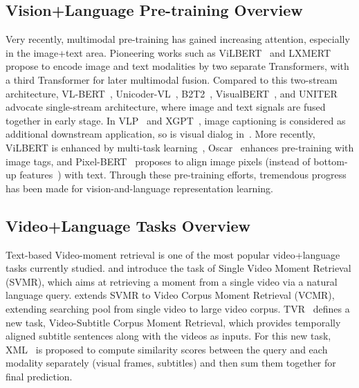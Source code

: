 \documentclass[11pt,a4paper]{article}
\begin{document}
\subsection{Vision+Language Pre-training Overview}\label{app:vl_overview}
Very recently, multimodal pre-training has gained increasing attention, especially in the image+text area.
Pioneering works such as ViLBERT~\cite{lu2019vilbert} and LXMERT~\cite{tan2019lxmert} propose to encode image and text modalities by two separate Transformers, with a third Transformer for later multimodal fusion. Compared to this two-stream architecture, 
VL-BERT~\cite{su2019vl}, Unicoder-VL~\cite{li2019unicoder}, B2T2~\cite{alberti2019fusion}, VisualBERT~\cite{li2019visualbert}, 
and UNITER~\cite{chen2019uniter} advocate single-stream architecture, where image and text signals are fused together in early stage. 
In VLP~\cite{zhou2019unified} and XGPT~\cite{xia2020xgpt}, image captioning is considered as additional downstream application, so is visual dialog in~\citet{murahari2019large}.  More recently, ViLBERT is enhanced by multi-task learning~\cite{lu201912}, Oscar~\cite{li2020oscar} enhances pre-training with image tags, and Pixel-BERT~\cite{huang2020pixel} proposes to align image pixels (instead of bottom-up features~\cite{anderson2018bottom}) with text.  Through these pre-training efforts, tremendous progress has been made for vision-and-language representation learning.

\subsection{Video+Language Tasks Overview}
Text-based Video-moment retrieval is one of the most popular video+language tasks currently studied.  \citet{anne2017localizing} and \citet{gao2017tall} introduce the task of Single Video Moment Retrieval (SVMR), which aims at retrieving a moment from a single video via a natural language query. \citet{escorcia2019temporal} extends SVMR to Video Corpus Moment Retrieval (VCMR), extending searching pool from single video to large video corpus. TVR~\citep{lei2020tvr} defines a new task, Video-Subtitle Corpus Moment Retrieval, which provides temporally aligned subtitle sentences along with the videos as inputs. For this new task, XML~\citep{lei2020tvr} is proposed to compute similarity scores between the query and each modality separately (visual frames, subtitles) and then sum them together for final prediction. 
\end{document}
